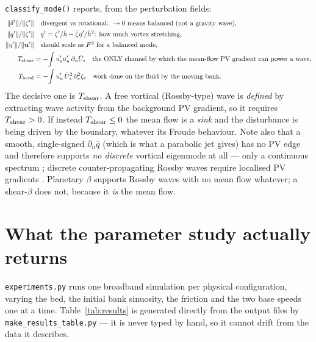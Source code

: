 \documentclass[11pt]{article}
\newcommand{\us}{u_s}
\newcommand{\un}{u_n}
\newcommand{\Us}{\bar U_s}
\newcommand{\dn}{\partial_n}
\newcommand{\code}[1]{\texttt{\small #1}}
\begin{document}
\code{classify\_mode()} reports, from the perturbation fields:
\begin{align*}
  \|\delta'\|/\|\zeta'\| &\quad\text{divergent vs rotational: }\to0\text{ means balanced (not a gravity wave)},\\
  \|q'\|/\|\zeta'\| &\quad q'=\zeta'/\bar h-\bar\zeta\eta'/\bar h^{2}\text{: how much vortex stretching},\\
  \|\eta'\|/\|\bm u'\| &\quad\text{should scale as }F^{2}\text{ for a balanced mode},\\
  T_{\rm shear}&=-\!\int \us'\un'\,\dn\Us
   \quad\text{the ONLY channel by which the mean-flow PV gradient can power a wave},\\
  T_{\rm bend}&=-\!\int \un'\,\Us^{2}\,\partial_s^{2}\zeta_c
   \quad\text{work done on the fluid by the moving bank.}
\end{align*}
The decisive one is $T_{\rm shear}$. A free vortical (Rossby-type) wave is
\emph{defined} by extracting wave activity from the background PV gradient, so it
requires $T_{\rm shear}>0$. If instead $T_{\rm shear}\le0$ the mean flow is a
\emph{sink} and the disturbance is being driven by the boundary, whatever its Froude
behaviour. Note also that a smooth, single-signed $\dn\bar q$ (which is what a
parabolic jet gives) has no PV edge and therefore supports \emph{no discrete}
vortical eigenmode at all --- only a continuous spectrum \cite{case1960}; discrete
counter-propagating Rossby waves require localised PV gradients \cite{bretherton1966}.
Planetary $\beta$ supports Rossby waves with no mean flow whatever; a shear-$\beta$
does not, because it \emph{is} the mean flow.

\section{What the parameter study actually returns}
\label{sec:results}

\code{experiments.py} runs one broadband simulation per physical configuration,
varying the bed, the initial bank sinuosity, the friction and the two base speeds one
at a time. Table~\ref{tab:results} is generated directly from the output files by
\code{make\_results\_table.py} --- it is never typed by hand, so it cannot drift from
the data it describes.

\begin{table}[h]\centering

\caption{Fastest \emph{converged} mode ($\ge3$ e-foldings) per configuration, and the
energetics ratio. $T_{\rm shear}>0$ would mean the mean-flow vorticity gradient powers
the disturbance.}
\label{tab:results}
\end{table}
\end{document}
